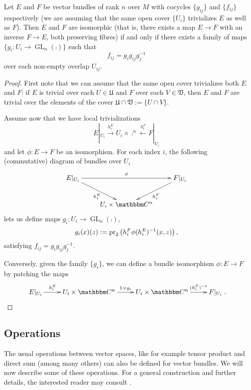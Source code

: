 \begin{proposition}\label{cocycles_iso}
  Let $E$ and $F$ be vector bundles of rank $n$ over $M$ with cocycles
  $\{g_{ij}\}$ and $\{f_{ij}\}$ respectively (we are assuming that the
  same open cover $\{U_i\}$ trivializes $E$ as well as $F$). Then $E$
  and $F$ are isomorphic (that is, there exists a map $E\to F$ with an
  inverse $F\to E$, both preserving fibres) if and only if there
  exists a family of maps $\{g_i:U_i\to \operatorname{GL}_n(\comp )\}$
  such that
$$f_{ij}=g_ig_{ij}g_j^{-1}$$
over each non-empty overlap $U_{ij}$.
\end{proposition}
\begin{proof}
  First note that we can assume that the same open cover trivializes
  both $E$ and $F$: if $E$ is trivial over each $U\in \mathfrak{U}$
  and $F$ over each $V\in \mathfrak{V}$, then $E$ and $F$ are trivial
  over the elements of the cover
  $\mathfrak{U}\cap \mathfrak{V}:=\{U\cap V\}$.

  Assume now that we have local trivializations
$$E|_{U_i}\stackrel{h^E_i}{\longrightarrow}U_i\times \comp^n \stackrel{h^F_i}{\longleftarrow} F|_{U_i}$$
and let $\phi :E\to F$ be an isomorphism. For each index $i$, the
following (commutative) diagram of bundles over $U_i$
$$
\xymatrix{
  E|_{U_i}\ar[rr]^\phi \ar[dr]_{h_i^E} & & F|_{U_i} \ar[dl]^{h_i^F} \\
  & U_i\times \comp^n & }
$$
lets us define maps $g_i:U_i\to \operatorname{GL}_n(\comp )$,
$$g_i(x)(z):=\operatorname{pr}_2\left (h_i^F\phi (h_i^E)^{-1}(x,z)\right ),$$
satisfying $f_{ij}=g_ig_{ij}g_j^{-1}$.

Conversely, given the family $\{g_i\}$, we can define a bundle
isomorphism $\phi :E\to F$ by patching the maps
$$
\xymatrix{ E|_{U_i}\ar[r]^-{h_i^E} & U_i\times \comp^n\ar[r]^{1\times
    g_i} & U_i\times \comp^n \ar[r]^-{(h_i^F)^{-1}}& F|_{U_i}}.$$
\end{proof}


\subsection{Operations}\label{bundles_operations}

The usual operations between vector spaces, like for example tensor
product and direct sum (among many others) can also be defined for
vector bundles. We will now describe some of these operations. For a
general construction and further details, the interested reader may
consult \cite{atiyah:_k}.

